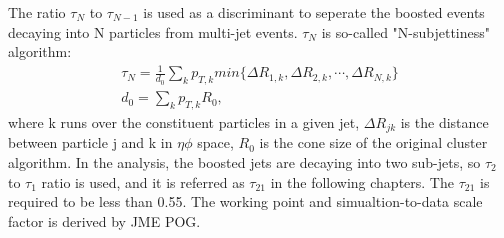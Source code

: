 The ratio $\tau _N $ to $\tau _{N-1}$ is used as a discriminant to seperate the boosted events decaying into N particles from multi-jet events. $\tau _N $ is so-called "N-subjettiness" algorithm:
\begin{equation} \label{eq6}
\begin{split}
\tau _N = \frac{1}{d_0} \sum\limits_{k}  p_{T,k} min \{ \Delta R_{1,k},\Delta R_{2,k},\cdots,\Delta R_{N,k} \} \\
d_0 = \sum\limits_{k}  p_{T,k} R_0,
\end{split}
\end{equation}
where k runs over the constituent particles in a given jet, $\Delta R_{jk}$ is the distance between particle j and k in $\eta \phi$ space, $R_0$ is the cone size of the original cluster algorithm. In the analysis, the boosted jets are decaying into two sub-jets, so $\tau _2 $ to $\tau _1$ ratio is used, and it is referred as $\tau _{21}$ in the following chapters.
The $\tau _{21}$ is required to be less than 0.55.  
The working point and simualtion-to-data scale factor is derived by JME POG.

